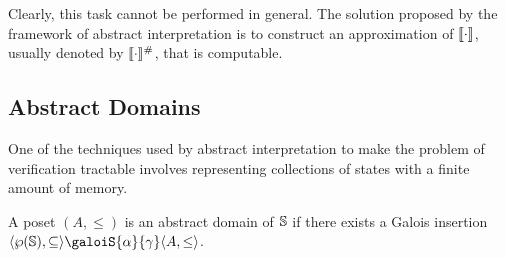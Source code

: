 \documentclass[
  10pt,       %
  twoside,    %
  a4paper,    %
  english,    %
  tikz,       %
  openright,  %
]{book}
\begin{document}
Clearly, this task cannot be performed in general. The solution proposed by the
framework of abstract interpretation is to construct an approximation of
$\llbracket \cdot \rrbracket$, usually denoted by $\llbracket \cdot \rrbracket^\#$, that is computable.

\subsection{Abstract Domains}

One of the techniques used by abstract interpretation to make the problem of 
verification tractable involves representing collections of states with a finite 
amount of memory.

\begin{definition}
  A poset $(A, \leq)$ is an abstract domain of $\mathbb{S}$ if there exists a
  Galois insertion $\langle \pow{\states}, \subseteq \rangle
  \galoiS{\alpha}{\gamma} \langle A, \leq \rangle$.
\end{definition}
\end{document}
